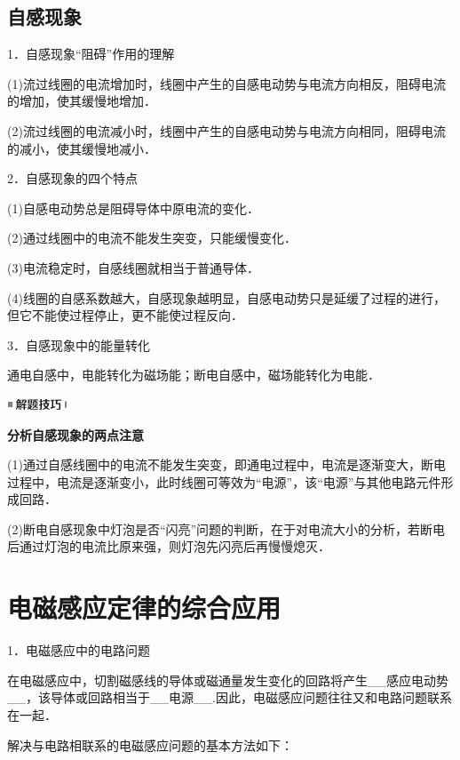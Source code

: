 \documentclass[cn,10.5pt,chinese,mac,chinesefont=founder]{elegantbook}
\begin{document}
\subsection{自感现象}

1．自感现象``阻碍''作用的理解

(1)流过线圈的电流增加时，线圈中产生的自感电动势与电流方向相反，阻碍电流的增加，使其缓慢地增加．

(2)流过线圈的电流减小时，线圈中产生的自感电动势与电流方向相同，阻碍电流的减小，使其缓慢地减小．

2．自感现象的四个特点

(1)自感电动势总是阻碍导体中原电流的变化．

(2)通过线圈中的电流不能发生突变，只能缓慢变化．

(3)电流稳定时，自感线圈就相当于普通导体．

(4)线圈的自感系数越大，自感现象越明显，自感电动势只是延缓了过程的进行，但它不能使过程停止，更不能使过程反向．

3．自感现象中的能量转化

通电自感中，电能转化为磁场能；断电自感中，磁场能转化为电能．

\begin{center}\includegraphics[width=0.70764in,height=0.12292in]{media/image37.png}\end{center}
\begin{center}
	\textbf{分析自感现象的两点注意}
\end{center}

(1)通过自感线圈中的电流不能发生突变，即通电过程中，电流是逐渐变大，断电过程中，电流是逐渐变小，此时线圈可等效为``电源''，该``电源''与其他电路元件形成回路．

(2)断电自感现象中灯泡是否``闪亮''问题的判断，在于对电流大小的分析，若断电后通过灯泡的电流比原来强，则灯泡先闪亮后再慢慢熄灭．


\newpage
\section{电磁感应定律的综合应用}

1．电磁感应中的电路问题

在电磁感应中，切割磁感线的导体或磁通量发生变化的回路将产生\_\_感应电动势\_\_，该导体或回路相当于\_\_电源\_\_.因此，电磁感应问题往往又和电路问题联系在一起．

解决与电路相联系的电磁感应问题的基本方法如下：
\end{document}
